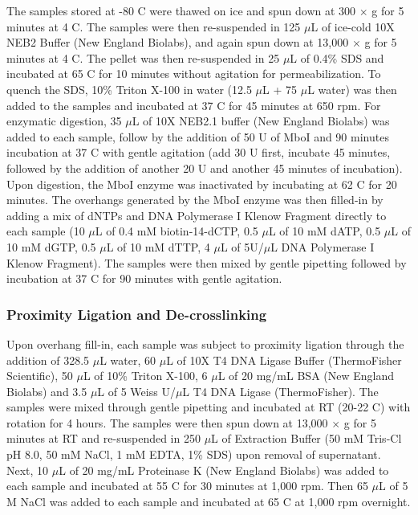 The samples stored at -80 \textdegree C were thawed on ice and spun down at 300 $\times$ g for 5 minutes at 4 \textdegree C.
The samples were then re-suspended in 125 $\mu$L of ice-cold 10X NEB2 Buffer (New England Biolabs), and again spun down at 13,000 $\times$ g for 5 minutes at 4 \textdegree C.
The pellet was then re-suspended in 25 $\mu$L of 0.4\% SDS and incubated at 65 \textdegree C for 10 minutes without agitation for permeabilization.
To quench the SDS, 10\% Triton X-100 in water (12.5 $\mu$L + 75 $\mu$L water) was then added to the samples and incubated at 37 \textdegree C for 45 minutes at 650 rpm.
For enzymatic digestion, 35 $\mu$L of 10X NEB2.1 buffer (New England Biolabs) was added to each sample, follow by the addition of 50 U of MboI and 90 minutes incubation at 37 \textdegree C with gentle agitation (add 30 U first, incubate 45 minutes, followed by the addition of another 20 U and another 45 minutes of incubation).
Upon digestion, the MboI enzyme was inactivated by incubating at 62 \textdegree C for 20 minutes.
The overhangs generated by the MboI enzyme was then filled-in by adding a mix of dNTPs and DNA Polymerase I Klenow Fragment directly to each sample (10 $\mu$L of 0.4 mM biotin-14-dCTP, 0.5 $\mu$L of 10 mM dATP, 0.5 $\mu$L of 10 mM dGTP, 0.5 $\mu$L of 10 mM dTTP, 4 $\mu$L of 5U/$\mu$L DNA Polymerase I Klenow Fragment).
The samples were then mixed by gentle pipetting followed by incubation at 37 \textdegree C for 90 minutes with gentle agitation.

\subsubsection{Proximity Ligation and De-crosslinking}

Upon overhang fill-in, each sample was subject to proximity ligation through the addition of 328.5 $\mu$L water, 60 $\mu$L of 10X T4 DNA Ligase Buffer (ThermoFisher Scientific), 50 $\mu$L of 10\% Triton X-100, 6 $\mu$L of 20 mg/mL BSA (New England Biolabs) and 3.5 $\mu$L of 5 Weiss U/$\mu$L T4 DNA Ligase (ThermoFisher).
The samples were mixed through gentle pipetting and incubated at RT (20-22 \textdegree C) with rotation for 4 hours.
The samples were then spun down at 13,000 $\times$ g for 5 minutes at RT and re-suspended in 250 $\mu$L of Extraction Buffer (50 mM Tris-Cl pH 8.0, 50 mM NaCl, 1 mM EDTA, 1\% SDS) upon removal of supernatant.
Next, 10 $\mu$L of 20 mg/mL Proteinase K (New England Biolabs) was added to each sample and incubated at 55 \textdegree C for 30 minutes at 1,000 rpm.
Then 65 $\mu$L of 5 M NaCl was added to each sample and incubated at 65 \textdegree C at 1,000 rpm overnight.

